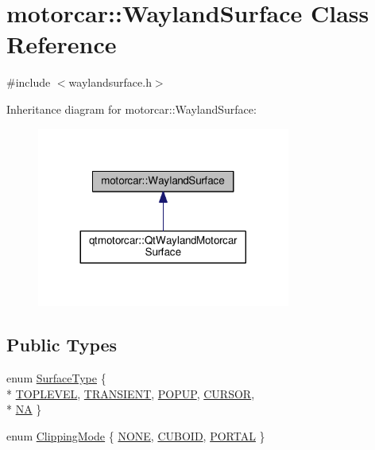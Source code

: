 \hypertarget{classmotorcar_1_1WaylandSurface}{\section{motorcar\-:\-:Wayland\-Surface Class Reference}
\label{classmotorcar_1_1WaylandSurface}
}


{\ttfamily \#include $<$waylandsurface.\-h$>$}



Inheritance diagram for motorcar\-:\-:Wayland\-Surface\-:
\nopagebreak
\begin{figure}[H]
\begin{center}
\leavevmode
\includegraphics[width=236pt]{classmotorcar_1_1WaylandSurface__inherit__graph}
\end{center}
\end{figure}
\subsection*{Public Types}
\begin{DoxyCompactItemize}
\item 
enum \hyperlink{classmotorcar_1_1WaylandSurface_a7715a41b6776800656722407ec01e0a5}{Surface\-Type} \{ \\*
\hyperlink{classmotorcar_1_1WaylandSurface_a7715a41b6776800656722407ec01e0a5adc40004cddf6c1404780c88ad509cede}{T\-O\-P\-L\-E\-V\-E\-L}, 
\hyperlink{classmotorcar_1_1WaylandSurface_a7715a41b6776800656722407ec01e0a5a5a1e368e9f069279fec128c5ebf04ee5}{T\-R\-A\-N\-S\-I\-E\-N\-T}, 
\hyperlink{classmotorcar_1_1WaylandSurface_a7715a41b6776800656722407ec01e0a5a91f194806c8b59a53b1ea5ee47d567dc}{P\-O\-P\-U\-P}, 
\hyperlink{classmotorcar_1_1WaylandSurface_a7715a41b6776800656722407ec01e0a5a23d1dd5df19bc211c5835e285ec08a46}{C\-U\-R\-S\-O\-R}, 
\\*
\hyperlink{classmotorcar_1_1WaylandSurface_a7715a41b6776800656722407ec01e0a5a6577b08859e961558d1960bc03de1d51}{N\-A}
 \}
\item 
enum \hyperlink{classmotorcar_1_1WaylandSurface_ab48793c19a30e8ad689fb4465cd27a70}{Clipping\-Mode} \{ \hyperlink{classmotorcar_1_1WaylandSurface_ab48793c19a30e8ad689fb4465cd27a70a313e451685f55c86a28a58749d17f65a}{N\-O\-N\-E}, 
\hyperlink{classmotorcar_1_1WaylandSurface_ab48793c19a30e8ad689fb4465cd27a70a993d6596581174cec9ac557a0641e9fa}{C\-U\-B\-O\-I\-D}, 
\hyperlink{classmotorcar_1_1WaylandSurface_ab48793c19a30e8ad689fb4465cd27a70a84a3b7daf3ca3cf265a8966e96bb446c}{P\-O\-R\-T\-A\-L}
 \}
\end{DoxyCompactItemize}
